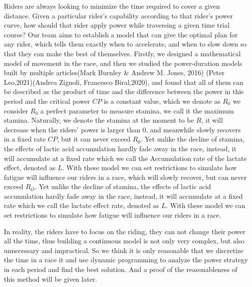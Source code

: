 \documentclass[12pt]{article}
\begin{document}
Riders are always looking to minimize the time required to cover a given distance. Given a
particular rider's capability according to that rider's power curve, how should that rider apply
power while traversing a given time trial course?
Our team aims to establish a model that can give the optimal plan for any  rider, which tells them exactly when to accelerate,
and when to slow down so that they can make the best of themselves. Firstly, we designed a mathematical model of movement in the race, and then we studied the power-duration models built by multiple articles(Mark Burnley \& Andrew M. Jones, 2016)\cite{doi:10.1080/17461391.2016.1249524}
(Peter Leo,2021)\cite{leo2021power}(Andrea Zignoli, Francesco Biral,2020)\cite{zignoli2020prediction}, and found that all of them can be described as the product of time and the difference
between the power in this period and the critical power $CP$ is a constant value, which we denote as $R_0$ we consider $R_0$ a perfect parameter to measure stamina, we call
it the maximum stamina. Naturally, we denote the stamina at the moment to be $R$, it
will decrease when the riders' power is larger than 0, and meanwhile slowly recovers in a fixed rate $CP$,
but it can never exceed $R_0$. Yet unlike the decline of stamina, the effects of lactic acid accumulation hardly fade away in the race, instead,
it will accumulate at a fixed rate which we call the Accumulation rate of the lactate effect, denoted as $L$. With these model we can set restrictions
to simulate how fatigue will influence our riders in a race,
which will slowly recover, but can never exceed $R_O$. Yet unlike the decline of stamina, the effects of lactic acid accumulation hardly fade away
in the race, instead, it will accumulate at a fixed rate which we call the lactate effect rate, denoted as $L$. With these model we can set restrictions
to simulate how fatigue will influence our riders in a race.

In reality, the riders have to focus on the riding, they can not change their power all the time, thus building a continuous model is not only very complex, but also unnecessary and impractical.
So we think it is only reasonable that we discretize the time in a race  it and use dynamic programming to analyze the power strategy in each period and find the best solution. And a proof of
the reasonableness of this method will be given later.
\end{document}
